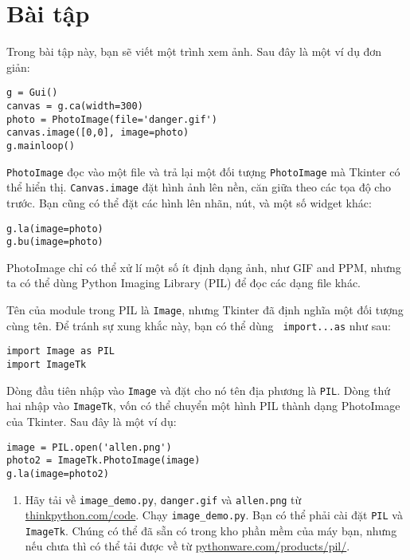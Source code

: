 \documentclass[11pt]{book}
\begin{document}
\section{Bài tập}

\begin{ex}

Trong bài tập này, bạn sẽ viết một trình xem ảnh. Sau đây
là một ví dụ đơn giản:

\beforeverb
\begin{verbatim}
g = Gui()
canvas = g.ca(width=300)
photo = PhotoImage(file='danger.gif')
canvas.image([0,0], image=photo)
g.mainloop()
\end{verbatim}
\afterverb
%
{\tt PhotoImage} đọc vào một file  và trả lại một đối tượng {\tt PhotoImage} 
mà Tkinter có thể hiển thị. {\tt Canvas.image} đặt hình ảnh lên nền,
căn giữa theo các tọa độ cho trước. Bạn cũng có thể đặt các hình lên
nhãn, nút, và một số widget khác:

\beforeverb
\begin{verbatim}
g.la(image=photo)
g.bu(image=photo)
\end{verbatim}
\afterverb
%
PhotoImage chỉ có thể xử lí một số ít định dạng ảnh, như GIF and PPM,
nhưng ta có thể dùng Python Imaging Library (PIL) để đọc các dạng file khác.


Tên của module trong PIL là {\tt Image}, nhưng Tkinter đã định nghĩa một 
đối tượng cùng tên. Để tránh sự xung khắc này, bạn có thể dùng {\tt
  import...as} như sau:

\beforeverb
\begin{verbatim}
import Image as PIL
import ImageTk
\end{verbatim}
\afterverb
%
Dòng đầu tiên nhập vào {\tt Image} và
đặt cho nó tên địa phương là {\tt PIL}.  Dòng thứ hai
nhập vào {\tt ImageTk}, vốn có thể chuyển một hình PIL
thành dạng PhotoImage của Tkinter. Sau đây là một ví dụ:

\beforeverb
\begin{verbatim}
image = PIL.open('allen.png')
photo2 = ImageTk.PhotoImage(image)
g.la(image=photo2)
\end{verbatim}
\afterverb
%

\begin{enumerate}

\item Hãy tải về \verb"image_demo.py", \verb"danger.gif" và \verb"allen.png"
từ \url{thinkpython.com/code}.  Chạy \verb"image_demo.py".  Bạn
có thể phải cài đặt {\tt PIL} và {\tt ImageTk}.  
Chúng có thể đã sẵn có trong kho phần mềm của máy bạn, nhưng
nếu chưa thì có thể tải được về từ \url{pythonware.com/products/pil/}.


\end{enumerate}
\end{ex}
\end{document}
